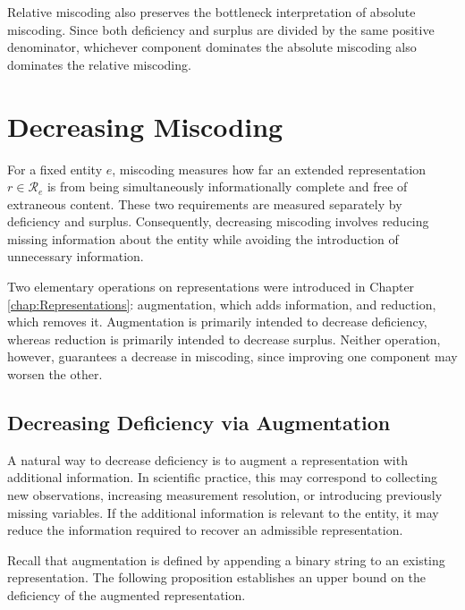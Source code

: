 Relative miscoding also preserves the bottleneck interpretation of absolute miscoding. Since both deficiency and surplus are divided by the same positive denominator, whichever component dominates the absolute miscoding also dominates the relative miscoding.

%
%

\section{Decreasing Miscoding}
\label{sec:decreasing_miscoding}

For a fixed entity $e$, miscoding measures how far an extended representation $r\in\mathcal R_e$ is from being simultaneously informationally complete and free of extraneous content. These two requirements are measured separately by deficiency and surplus. Consequently, decreasing miscoding involves reducing missing information about the entity while avoiding the introduction of unnecessary information.

Two elementary operations on representations were introduced in Chapter \ref{chap:Representations}: augmentation, which adds information, and reduction, which removes it. Augmentation is primarily intended to decrease deficiency, whereas reduction is primarily intended to decrease surplus. Neither operation, however, guarantees a decrease in miscoding, since improving one component may worsen the other.


\subsection*{Decreasing Deficiency via Augmentation}

A natural way to decrease deficiency is to augment a representation with additional information. In scientific practice, this may correspond to collecting new observations, increasing measurement resolution, or introducing previously missing variables. If the additional information is relevant to the entity, it may reduce the information required to recover an admissible representation.

Recall that augmentation is defined by appending a binary string to an existing representation. The following proposition establishes an upper bound on the deficiency of the augmented representation.

